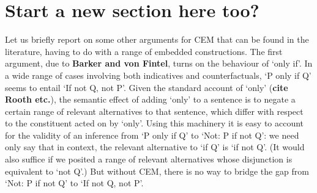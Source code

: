 \documentclass[If.tex]{subfiles}
\begin{document}
\section{Start a new section here too?}
Let us briefly report on some other arguments for CEM that can be found in the literature, having to do with a range of embedded constructions. The first argument, due to \textbf{Barker and von Fintel}, turns on the behaviour of ‘only if’. In a wide range of cases involving both indicatives and counterfactuals, ‘P only if Q’ seems to entail ‘If not Q, not P’. Given the standard account of ‘only’ (\textbf{cite Rooth etc.}), the semantic effect of adding ‘only’ to a sentence is to negate a certain range of relevant alternatives to that sentence, which differ with respect to the constituent acted on by ‘only’. Using this machinery it is easy to account for the validity of an inference from ‘P only if Q’ to ‘Not: P if not Q’: we need only say that in context, the relevant alternative to ‘if Q’ is ‘if not Q’. (It would also suffice if we posited a range of relevant alternatives whose disjunction is equivalent to ‘not Q’.) But without CEM, there is no way to bridge the gap from ‘Not: P if not Q’ to ‘If not Q, not P’.%
\end{document}
